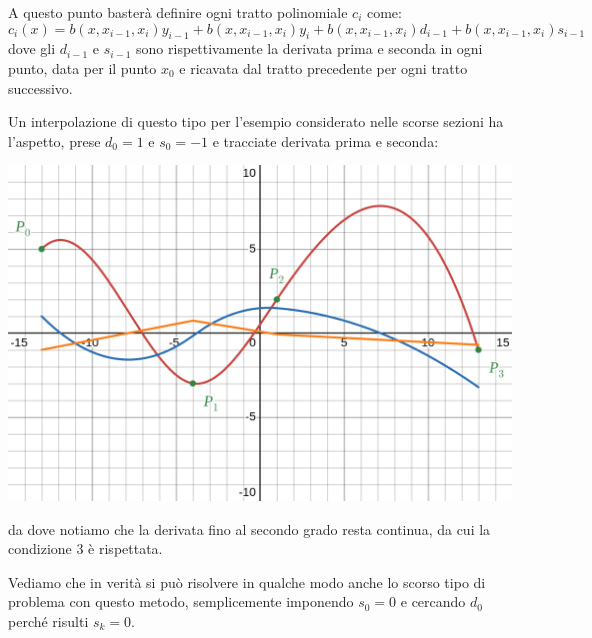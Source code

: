\documentclass[a4paper,11pt]{article}
\begin{document}
\begin{itemize}
		A questo punto basterà definire ogni tratto polinomiale $c_i$ come:
		$$
		c_{i}\left(x\right)=b\left(x,x_{i-1},x_{i}\right)y_{i-1}+b\left(x,x_{i-1},x_{i}\right)y_{i}+b\left(x,x_{i-1},x_{i}\right)d_{i-1}+b\left(x,x_{i-1},x_{i}\right)s_{i-1}\
		$$
		dove gli $d_{i-1}$ e $s_{i-1}$ sono rispettivamente la derivata prima e seconda in ogni punto, data per il punto $x_0$ e ricavata dal tratto precedente per ogni tratto successivo.

		Un interpolazione di questo tipo per l'esempio considerato nelle scorse sezioni ha l'aspetto, prese $d_{0} = 1$ e $s_{0} = -1$ e tracciate derivata prima e seconda:
		\begin{center}
			\includegraphics[scale=0.3]{../figures/multipoly_3.png}
		\end{center}
		da dove notiamo che la derivata fino al secondo grado resta continua, da cui la condizione 3 è rispettata.

		Vediamo che in verità si può risolvere in qualche modo anche lo scorso tipo di problema con questo metodo, semplicemente imponendo $s_0 = 0$ e cercando $d_0$ perché risulti $s_k = 0$.

		\par\medskip
		\noindent


\end{itemize}
\end{document}
